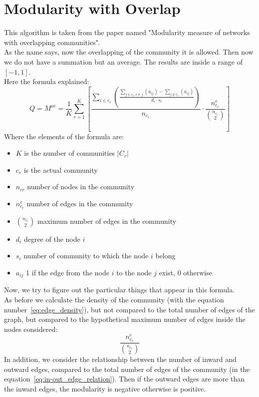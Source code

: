 \documentclass[epsfig,a4paper,11pt,titlepage,twoside,openany]{book}
\begin{document}
\section{Modularity with Overlap}
This algorithm is taken from the paper named "Modularity measure of networks with overlapping communities".\\
As the name says, now the overlapping of the community it is allowed. Then now we do not have a summation but an average. The results are inside a range of $[-1, 1]$.\\
Here the formula explained:
\begin{equation}
	Q = M^{ov} = \frac{1}{K} 
	\sum_{r=1}^{K} \left[
		\frac
			{\sum\limits_{i \in c_r} 
				\left( \frac
					{
						\sum\limits_{j \in c_r, i \neq j} \left( a_{ij} \right) 
						- 
						\sum\limits_{j \notin c_r} \left( a_{ij} \right) 
					} 
					{d_i \cdot s_i} 
				\right) } 
			{n_{c_r}}
		\cdot
		\frac{ n^e_{c_r} }{ \binom{n_{c_r}}{2} } 
	\right]
	\label{eq:m_over}
\end{equation}
Where the elements of the formula are:
\begin{itemize}
	\item $K$ is the number of communities $|C_r|$
	\item $c_r$ is the actual community
	\item $n_{cr}$ number of nodes in the community
	\item $n^e_{c_r}$ number of edges in the community
	\item $\binom{n_{c_r}}{2}$ maximum number of edges in the community
	\item $d_i$ degree of the node $i$
	\item $s_i$ number of community to which the node $i$ belong
	\item $a_{ij}$ 1 if the edge from the node $i$ to the node $j$ exist, 0 otherwise
\end{itemize}
Now, we try to figure out the particular things that appear in this formula.\\
As before we calculate the density of the community (with the equation number~\ref{eq:edge_density}), but not compared to the total number of edges of the graph, but compared to the hypothetical maximum number of edges inside the nodes considered:
\begin{equation}
	\frac{ n^e_{c_r} }{ \binom{n_{c_r}}{2} }
	\label{eq:edge_density}
\end{equation}
In addition, we consider the relationship between the number of inward and outward edges, compared to the total number of edges of the community (in the equation~\ref{eq:in-out_edge_relation}). Then if the outward edges are more than the inward edges, the modularity is negative otherwise is positive.\\
\end{document}
